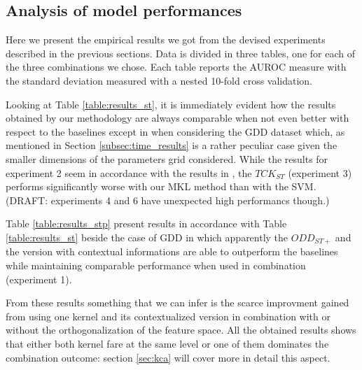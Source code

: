 
\subsection{Analysis of model performances}

Here we present the empirical results we got from the devised experiments described
in the previous sections.
Data is divided in three tables, one for each of the three combinations we chose.
Each table reports the AUROC measure with the standard deviation measured with
a nested 10-fold cross validation.

Looking at Table \ref{table:results_st}, it is immediately evident how the results
obtained by our methodology are always comparable when not even better with respect
to the baselines except in when considering the GDD dataset which, as mentioned in
Section \ref{subsec:time_results} is a rather peculiar case given the smaller dimensions
of the parameters grid considered.
While the results for experiment 2 seem in accordance with the results in \cite{gmkl},
the $TCK_{ST}$ (experiment 3) performs significantly worse with our MKL method than with
the SVM.
(DRAFT: experiments 4 and 6 have unexpected high performancs though.)

Table \ref{table:results_stp} present results in accordance with Table \ref{table:results_st}
beside the case of GDD in which apparently the $ODD_{ST+}$ and the version with
contextual informations are able to outperform the baselines while maintaining
comparable performance when used in combination (experiment 1).

From these results something that we can infer is the scarce improvment gained from
using one kernel and its contextualized version in combination with or without
the orthogonalization of the feature space.
All the obtained results shows that either both kernel fare at the same level or
one of them dominates the combination outcome: section \ref{sec:kca} will cover
more in detail this aspect.

